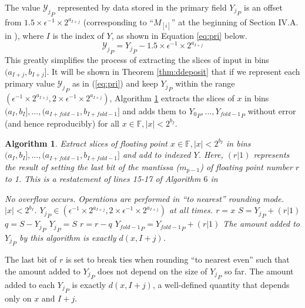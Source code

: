 \documentclass[12pt]{article}
\providecommand{\F}{\ensuremath{\mathbb{F}}}
\providecommand{\To}{\ensuremath{\text{ to }}}
\theoremstyle{plain}
\newtheorem{alg}{Algorithm}[section]
\numberwithin{equation}{section}
\begin{document}
      The value ${\mathcal{Y}_j}_P$ represented by data stored in the primary field ${Y_j}_P$ is an offset from $1.5\times \epsilon^{-1} \times 2^{a_{I + j}}$ (corresponding to ``$M_{[i]}$'' at the beginning of Section IV.A. in \cite{repsum}), where $I$ is the index of $Y$, as shown in Equation \ref{eq:pri} below.
      \begin{equation}
        {\mathcal{Y}_j}_P = {Y_j}_P - 1.5\times\epsilon^{-1}\times2^{a_{I + j}}
        \label{eq:pri}
      \end{equation}
      This greatly simplifies the process of extracting the slices of input in bins $(a_{I + j}, b_{I + j}]$. It will be shown in Theorem \ref{thm:ddeposit} that if we represent each primary value ${\mathcal{Y}_j}_P$ as in (\ref{eq:pri}) and keep ${Y_j}_P$ within the range $(\epsilon^{-1} \times 2^{a_{I + j}}, 2 \times \epsilon^{-1} \times 2^{a_{I + j}})$, Algorithm \ref{alg:deposit} extracts the slices of $x$ in bins $(a_I, b_I], ..., (a_{I + fold - 1}, b_{I + fold - 1}]$ and adds them to ${Y_0}_P, ..., {Y_{fold - 1}}_P$ without error (and hence reproducibly) for all $x \in \F, |x| < 2^{b_I}$.
      \begin{alg}
        Extract slices of floating point $x \in \F, |x| < 2^{b_I}$ in bins $(a_I, b_I], ..., (a_{I + fold - 1}, b_{I + fold - 1}]$ and add to indexed $Y$. Here, $(r | 1)$ represents the result of setting the last bit of the mantissa ($m_{p - 1}$) of floating point number $r$ to 1. This is a restatement of lines 15-17 of Algorithm $6$ in \cite{repsum}
        \begin{algorithmic}[1]
          \Require
          \Statex No overflow occurs.
          \Statex Operations are performed in ``to nearest'' rounding mode.
          \Statex $|x| < 2^{b_I}$.
          \Statex ${Y_j}_P \in (\epsilon^{-1} \times 2^{a_{I + j}}, 2 \times \epsilon^{-1} \times 2^{a_{I + j}})$ at all times.
            \State $r = x$ \label{alg:deposit:rgetsx}
            \For{$j = 0 \To (fold - 2)$} \label{alg:deposit:loop}
              \State $S = {Y_j}_P + (r | 1)$ \label{alg:deposit:split}
              \State $q = S - {Y_j}_P$
              \State ${Y_j}_P = S$
              \State $r = r - q$\label{alg:deposit:endsplit}
            \EndFor
            \State ${Y_{fold - 1}}_P = {Y_{fold - 1}}_P + (r | 1)$
          \EndFunction
          \Ensure
          \Statex The amount added to ${Y_j}_P$ by this algorithm is exactly $d(x, I + j)$.
        \end{algorithmic}
        \label{alg:deposit}
      \end{alg}
      The last bit of $r$ is set to break ties when rounding ``to nearest even'' such that the amount added to ${Y_j}_P$ does not depend on the size of ${Y_j}_P$ so far. The amount added to each ${Y_j}_P$ is exactly $d(x, I + j)$, a well-defined quantity that depends only on $x$ and $I + j$.
\end{document}
